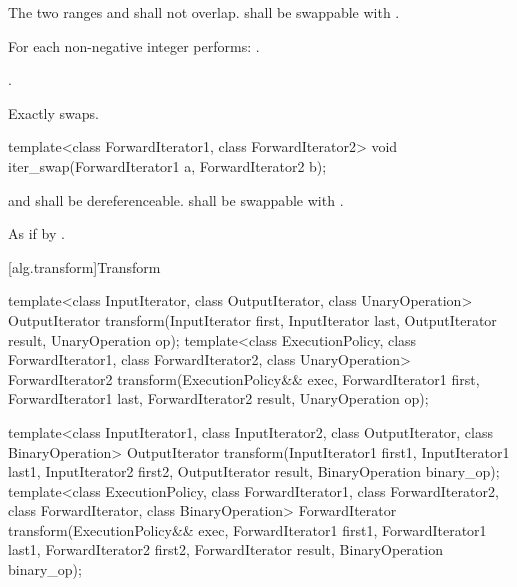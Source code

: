 \begin{itemdescr}
\pnum
\requires
The two ranges 
and
shall not overlap.
 shall be swappable with
.

\pnum
\effects
For each non-negative integer
performs:
.

\pnum
\returns
{}.

\pnum
\complexity
Exactly
swaps.
\end{itemdescr}

%
\begin{itemdecl}
template<class ForwardIterator1, class ForwardIterator2>
  void iter_swap(ForwardIterator1 a, ForwardIterator2 b);
\end{itemdecl}

\begin{itemdescr}
\pnum
\requires
{} and  shall be dereferenceable.  shall be
swappable with .

\pnum
\effects
As if by .
\end{itemdescr}

[alg.transform]{Transform}

%
\begin{itemdecl}
template<class InputIterator, class OutputIterator,
         class UnaryOperation>
  OutputIterator
    transform(InputIterator first, InputIterator last,
              OutputIterator result, UnaryOperation op);
template<class ExecutionPolicy, class ForwardIterator1, class ForwardIterator2,
         class UnaryOperation>
  ForwardIterator2
    transform(ExecutionPolicy&& exec,
              ForwardIterator1 first, ForwardIterator1 last,
              ForwardIterator2 result, UnaryOperation op);

template<class InputIterator1, class InputIterator2,
         class OutputIterator, class BinaryOperation>
  OutputIterator
    transform(InputIterator1 first1, InputIterator1 last1,
              InputIterator2 first2, OutputIterator result,
              BinaryOperation binary_op);
template<class ExecutionPolicy, class ForwardIterator1, class ForwardIterator2,
         class ForwardIterator, class BinaryOperation>
  ForwardIterator
    transform(ExecutionPolicy&& exec,
              ForwardIterator1 first1, ForwardIterator1 last1,
              ForwardIterator2 first2, ForwardIterator result,
              BinaryOperation binary_op);
\end{itemdecl}

